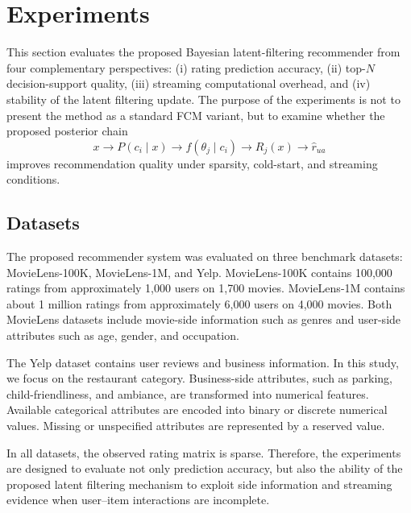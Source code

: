 \documentclass{article}
\theoremstyle{plain}
\theoremstyle{definition}
\theoremstyle{remark}
\begin{document}








\section{Experiments}
\label{sec:experiments}

This section evaluates the proposed Bayesian latent-filtering recommender from four complementary perspectives:
(i) rating prediction accuracy, (ii) top-\(N\) decision-support quality, (iii) streaming computational overhead, and (iv) stability of the latent filtering update. The purpose of the experiments is not to present the method as a standard FCM variant, but to examine whether the proposed posterior chain
\[
x
\longrightarrow
P(c_i\mid x)
\longrightarrow
f(\theta_j\mid c_i)
\longrightarrow
R_j(x)
\longrightarrow
\widehat r_{ua}
\]
improves recommendation quality under sparsity, cold-start, and streaming conditions.

\subsection{Datasets}
\label{subsec:datasets}

The proposed recommender system was evaluated on three benchmark datasets: MovieLens-100K, MovieLens-1M, and Yelp. MovieLens-100K contains 100,000 ratings from approximately 1,000 users on 1,700 movies. MovieLens-1M contains about 1 million ratings from approximately 6,000 users on 4,000 movies. Both MovieLens datasets include movie-side information such as genres and user-side attributes such as age, gender, and occupation.

The Yelp dataset contains user reviews and business information. In this study, we focus on the restaurant category. Business-side attributes, such as parking, child-friendliness, and ambiance, are transformed into numerical features. Available categorical attributes are encoded into binary or discrete numerical values. Missing or unspecified attributes are represented by a reserved value.

In all datasets, the observed rating matrix is sparse. Therefore, the experiments are designed to evaluate not only prediction accuracy, but also the ability of the proposed latent filtering mechanism to exploit side information and streaming evidence when user--item interactions are incomplete.
\end{document}
